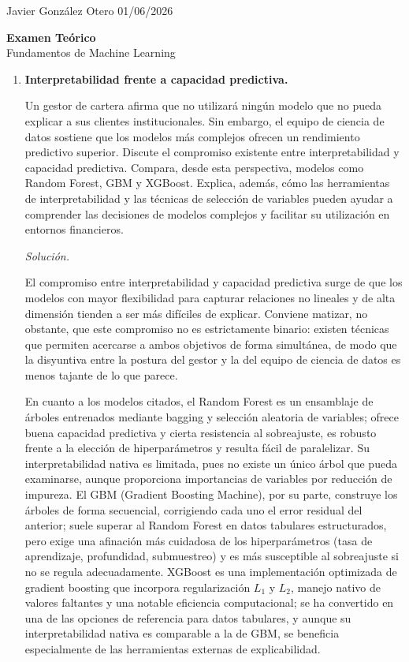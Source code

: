 \documentclass[12pt]{article}
\newcommand\sol[1]{\begin{mdframed}
\emph{Solución.} #1
\end{mdframed}}
\begin{document}
\noindent Javier González Otero \hfill 01/06/2026

\begin{center}
    \vspace{1em}
    {\large \textbf{Examen Teórico}} \\
    {Fundamentos de Machine Learning}
    \vspace{1em}
\end{center}

\begin{enumerate}

\item \textbf{Interpretabilidad frente a capacidad predictiva.}

Un gestor de cartera afirma que no utilizará ningún modelo que no pueda explicar a sus clientes
institucionales. Sin embargo, el equipo de ciencia de datos sostiene que los modelos más complejos
ofrecen un rendimiento predictivo superior. Discute el compromiso existente entre interpretabilidad
y capacidad predictiva. Compara, desde esta perspectiva, modelos como Random Forest, GBM y
XGBoost. Explica, además, cómo las herramientas de interpretabilidad y las técnicas de selección de
variables pueden ayudar a comprender las decisiones de modelos complejos y facilitar su utilización
en entornos financieros.

\sol{

El compromiso entre interpretabilidad y capacidad predictiva surge de que los modelos con mayor
flexibilidad para capturar relaciones no lineales y de alta dimensión tienden a ser más difíciles de
explicar. Conviene matizar, no obstante, que este compromiso no es estrictamente binario: existen
técnicas que permiten acercarse a ambos objetivos de forma simultánea, de modo que la disyuntiva
entre la postura del gestor y la del equipo de ciencia de datos es menos tajante de lo que parece.

En cuanto a los modelos citados, el Random Forest es un ensamblaje de árboles entrenados mediante
bagging y selección aleatoria de variables; ofrece buena capacidad predictiva y cierta resistencia
al sobreajuste, es robusto frente a la elección de hiperparámetros y resulta fácil de paralelizar.
Su interpretabilidad nativa es limitada, pues no existe un único árbol que pueda examinarse, aunque
proporciona importancias de variables por reducción de impureza. El GBM (Gradient Boosting Machine),
por su parte, construye los árboles de forma secuencial, corrigiendo cada uno el error residual del
anterior; suele superar al Random Forest en datos tabulares estructurados, pero exige una afinación
más cuidadosa de los hiperparámetros (tasa de aprendizaje, profundidad, submuestreo) y es más
susceptible al sobreajuste si no se regula adecuadamente. XGBoost es una implementación optimizada
de gradient boosting que incorpora regularización $L_1$ y $L_2$, manejo nativo de valores faltantes
y una notable eficiencia computacional; se ha convertido en una de las opciones de referencia para
datos tabulares, y aunque su interpretabilidad nativa es comparable a la de GBM, se beneficia
especialmente de las herramientas externas de explicabilidad.

}
\end{enumerate}
\end{document}
